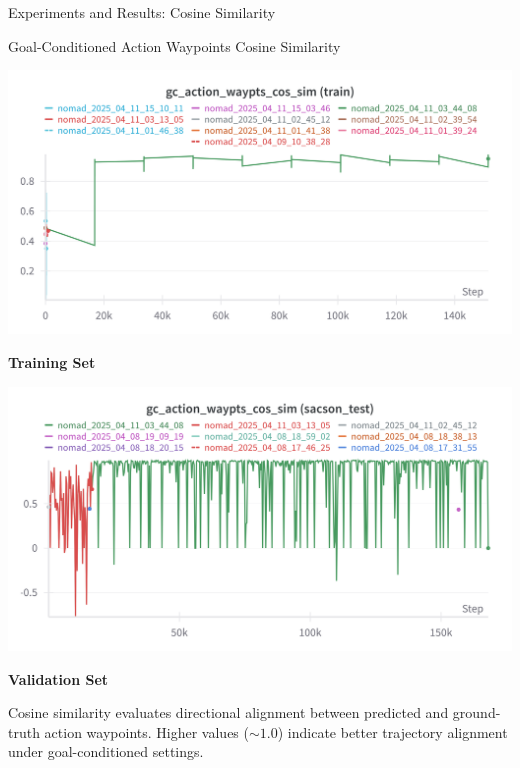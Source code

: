 \documentclass{beamer}
\begin{document}
    \begin{frame}{Experiments and Results: Cosine Similarity}
        \begin{block}{Goal-Conditioned Action Waypoints Cosine Similarity}
            \begin{minipage}{0.48\textwidth}
                \centering
                \includegraphics[width=\textwidth]{images/gc_action_sim_nomad.png}
    
            
                \textbf{Training Set}
            \end{minipage}
            \hfill
            \begin{minipage}{0.48\textwidth}
                \centering
                \includegraphics[width=\textwidth]{images/gc_action_cos_sim_test.png}
    
                \textbf{Validation Set}
            \end{minipage}
            
            \vspace{0.5em}
            \bigskip
            Cosine similarity evaluates directional alignment between predicted and ground-truth action waypoints. 
            Higher values ($\sim1.0$) indicate better trajectory alignment under goal-conditioned settings.
        \end{block}
    \end{frame}
\end{document}
